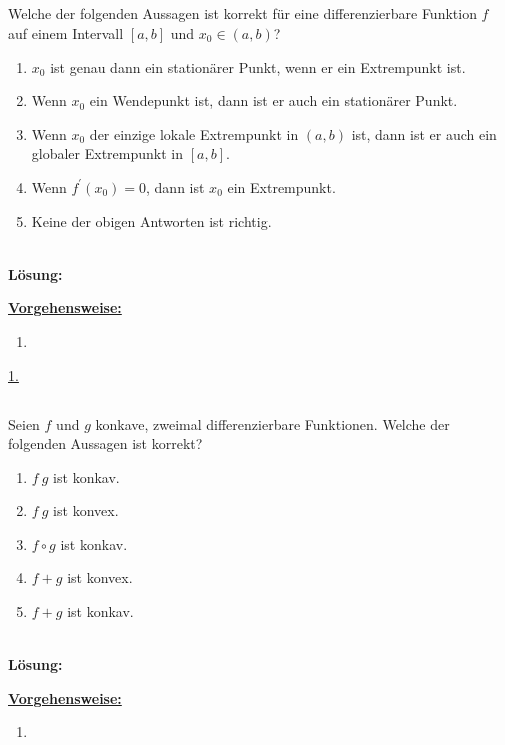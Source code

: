 \subsection*{}
Welche der folgenden Aussagen ist korrekt für eine differenzierbare Funktion $f$ auf einem Intervall $[a,b]$ und $x_0 \in (a,b)$?
\renewcommand{\labelenumi}{(\alph{enumi})}
\begin{enumerate}
	\item 
	$x_0$ ist genau dann ein stationärer Punkt, wenn er ein Extrempunkt ist.
	\item
	Wenn $x_0$ ein Wendepunkt ist, dann ist er auch ein stationärer Punkt.
	\item
	Wenn $x_0$ der einzige lokale Extrempunkt in $(a,b)$ ist, dann ist er auch ein globaler Extrempunkt in $[a,b]$.
	\item
	Wenn $f^\prime(x_0) = 0$, dann ist $x_0$ ein Extrempunkt.
	\item
	Keine der obigen Antworten ist richtig.
\end{enumerate}
\ \\
\textbf{Lösung:}
\begin{mdframed}
\underline{\textbf{Vorgehensweise:}}
\renewcommand{\labelenumi}{\theenumi.}
\begin{enumerate}
\item 
\end{enumerate}
\end{mdframed}

\underline{1. }\\




\newpage

\subsection*{}
Seien $f$ und $g$ konkave, zweimal differenzierbare Funktionen. Welche der folgenden Aussagen ist korrekt?
\renewcommand{\labelenumi}{(\alph{enumi})}
\begin{enumerate}
	\item 
	$f \ g$ ist konkav.
	\item
	$f \ g$ ist konvex.
	\item
	$f \circ g $ ist konkav.
	\item
	$f +g $ ist konvex.
	\item 
	$f+g$ ist konkav.
\end{enumerate}
\ \\
\textbf{Lösung:}
\begin{mdframed}
\underline{\textbf{Vorgehensweise:}}
\renewcommand{\labelenumi}{\theenumi.}
\begin{enumerate}
\item 
\end{enumerate}
\end{mdframed}

